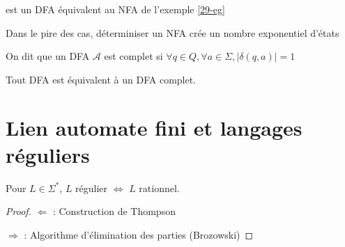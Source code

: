 \begin{example}
	
	\begin{minipage}{0.5\linewidth}
	\end{minipage} \begin{minipage}{0.4\linewidth}
		est un DFA équivalent au NFA de l'exemple \ref{29-eg}
	\end{minipage}
	
\end{example}

\begin{rem}
	Dans le pire des cas, déterminiser un NFA crée un nombre exponentiel d'états
\end{rem}

\begin{definition}
	On dit que un DFA $\mathcal A$ est complet si $\forall q \in Q, \forall a \in \Sigma, |\delta(q, a)| = 1$
\end{definition}

\begin{theorem}
	Tout DFA est équivalent à un DFA complet.
\end{theorem}

\section{Lien automate fini et langages réguliers}

\begin{theorem}[Kleene]
	Pour $L \in \Sigma^*$, $L$ régulier $\Leftrightarrow$ $L$ rationnel.
\end{theorem}

\begin{proof}
	$\Leftarrow$ : Construction de Thompson
	
	$\Rightarrow$ : Algorithme d'élimination des parties (Brozowski)
\end{proof}

